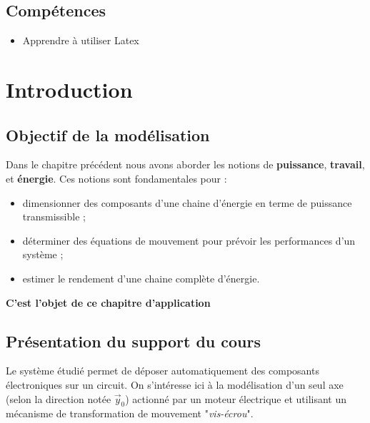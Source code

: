 \documentclass[a4paper,10pt]{article}
\newcommand{\pathpackage}{/Users/emiliendurif/Documents/prepa/latex}
\begin{document}
 
	
	\subsection*{Compétences}
	\begin{itemize}
	\item Apprendre à utiliser Latex
\end{itemize}	


\section{Introduction}
\subsection{Objectif de la modélisation}
Dans le chapitre précédent nous avons aborder les notions de \textbf{puissance}, \textbf{travail}, et \textbf{énergie}. Ces notions sont fondamentales pour :
\begin{itemize}
\item dimensionner des composants d'une chaine d'énergie en terme de puissance transmissible ;
\item déterminer des équations de mouvement pour prévoir les performances d'un système ;
\item estimer le rendement d'une chaine complète d'énergie.
\end{itemize}

\textbf{C'est l'objet de ce chapitre d'application}


\subsection{Présentation du support du cours}

Le système étudié permet de déposer automatiquement des composants électroniques sur un circuit.
On s'intéresse ici à la modélisation d'un seul axe (selon la direction notée $\overrightarrow{y}_0$) actionné par un moteur électrique et utilisant un mécanisme de transformation de mouvement "\textit{vis-écrou}".
\end{document}
